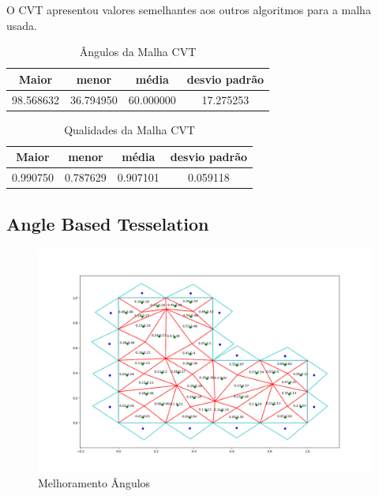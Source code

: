 O CVT apresentou valores semelhantes aos outros algoritmos para a malha usada.

\begin{table}[hb]
\centering
\par\caption{Ângulos da Malha CVT}
\begin{tabular}{c|c|c|c}
Maior&menor&média&desvio padrão\\\hline\hline
98.568632&36.794950	&60.000000&17.275253\\\hline
\end{tabular}
\label{tab:angulos-malha-cvt}
\end{table}

\begin{table}[hb]
\centering
\par\caption{Qualidades da Malha CVT}
\begin{tabular}{c|c|c|c}
Maior&menor&média&desvio padrão\\\hline\hline
0.990750&0.787629&0.907101&0.059118\\\hline
\end{tabular}
\label{tab:qualidades-malha-cvt}
\end{table}

\newpage
\subsection{Angle Based Tesselation}

\begin{figure}[ht]
    \centering
    \includegraphics[width=1\linewidth]{fig/malha-angulos.png}
    \caption{Melhoramento Ângulos}
    \label{fig:malha-angulos}
\end{figure}

